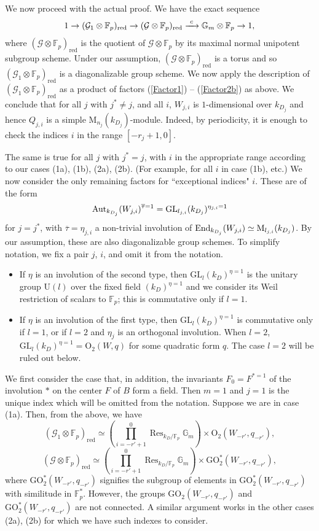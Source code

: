 \documentclass[reqno, 10pt]{amsart}
\makeatletter
\newcommand{\BF}{\ensuremath{\mathbb {F}}\xspace}
\newcommand{\BG}{\ensuremath{\mathbb {G}}\xspace}
\newcommand{\CG}{\ensuremath{\mathcal {G}}\xspace}
\newcommand{\RM}{\ensuremath{\mathrm {M}}\xspace}
\newcommand{\RO}{\ensuremath{\mathrm {O}}\xspace}
\newcommand{\RU}{\ensuremath{\mathrm {U}}\xspace}
\newcommand{\GL}{\mathrm{GL}}
\newcommand{\GO}{\mathrm{GO}}
\newcommand{\red}{\ensuremath{\mathrm{red}}\xspace}
\DeclareMathOperator{\Res}{Res}
\newcommand{\ov}{\overline}
\theoremstyle{definition}
\numberwithin{equation}{subsection}
\numberwithin{subsubsection}{subsection}
\renewcommand{\to}{%
   \ifbool{@display}{\longrightarrow}{\rightarrow}%
   }
\makeatother
\begin{document}
 

We now proceed with the actual proof.
We have the exact sequence
\[
1\to (\CG_1\otimes\BF_p)_{\red}\to (\CG\otimes\BF_p)_{\red}\xrightarrow{\ c\ }\BG_m\otimes\BF_p\to 1,
\]
where $(\CG\otimes\BF_p)_{\red}$ is the quotient of $\CG\otimes\BF_p$ by its maximal normal unipotent subgroup scheme.
Under our assumption, $(\CG\otimes\BF_p)_{\red}$ is a torus and so $(\CG_1\otimes\BF_p)_{\red}$ is a diagonalizable group scheme. We now apply the description of 
$(\CG_1\otimes\BF_p)_{\red}$ as a product of factors (\ref{Factor1}) -- (\ref{Factor2b}) as above.
We conclude that for all $j$ with $j^*\neq j$, and all $i$, $W_{j,i}$ is $1$-dimensional over $k_{D_j}$ and hence $Q_{j,i}$ is a simple $\RM_{n_j}(k_{D_j})$-module. Indeed, by periodicity, it is enough to check the indices $i$ in the range $[-r_j+1, 0]$.

The same is true for all $j$ with $j^*=j$, with $i$ in the appropriate range according to our cases (1a), (1b), (2a), (2b).
(For example, for all $i$ in case (1b), etc.) We now consider
the only remaining factors for ``exceptional indices" $i$. These are of the form
\[ 
{\rm Aut}_{k_{D_j}}(W_{j,i} )^{\ov\tau=1}=\GL_{l_{j,i}}(k_{D_j})^{\eta_{j,i}=1}
\]
for $j=j^*$, with $\ov\tau=\eta_{j,i}$ a non-trivial involution of ${\rm End}_{k_{D_j}}(W_{j,i})\simeq \RM_{l_{j,i}}(k_{D_j})$. By our assumption, these are also diagonalizable group schemes.  To simplify notation, we fix a pair $j$, $i$, and omit it from the notation.


 
\begin{itemize}
\item If $\eta$ is an involution of the second type, 
then $\GL_{l}(k_{D})^{\eta=1}$ is the unitary group $\RU(l)$ over the fixed field $(k_{D})^{\eta=1}$ and we consider its Weil restriction of scalars to $\BF_p$; this is commutative only if $l=1$.
 

\item If $\eta$ is an involution of the first type, then $\GL_{l }(k_{D})^{\eta=1}$ is commutative only if $l=1$, or if $l=2$ and 
$\eta_j$ is an orthogonal involution. When $l=2$, $\GL_{l}(k_{D})^{\eta=1}=\RO_2(W, q)$ for some quadratic form $q$. The case $l=2$
will  be ruled out below.
\end{itemize}

We first consider the case that, in addition, the invariants $F_0=F^{*=1}$ of the involution $*$ on the center $F$ of $B$ form a field.
Then $m=1$   and  $j=1$ is the unique index which will be omitted from the notation. Suppose we are in case (1a). Then, from the above, we have
\[
(\CG_1\otimes\BF_p)_{\red}\simeq  (\prod_{i=-r'+1}^0 \Res_{k_D/\BF_p}\BG_m)\times \RO_2(W_{-r'}, q_{-r'}),
\]
\[
(\CG\otimes\BF_p)_{\red}\simeq   (\prod_{i=-r'+1}^0 \Res_{k_D/\BF_p}\BG_m)\times \GO^*_2(W_{-r'}, q_{-r'}),
\]
where $\GO^*_2(W_{-r'},q_{-r'})$ signifies the subgroup of elements in $\GO^*_2(W_{-r'}, q_{-r'})$ with similitude in $\BF_p^*$. However, the groups
$\GO_2(W_{-r'}, q_{-r'})$ and $\GO^*_2(W_{-r'}, q_{-r'})$ are not connected. A similar argument works in the other cases (2a), (2b) for which we have such indexes to consider.  
\end{document}
